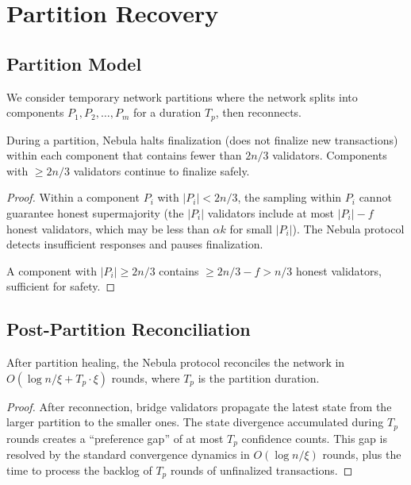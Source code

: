 \section{Partition Recovery}

\label{sec:partition}

\subsection{Partition Model}

We consider temporary network partitions where the network splits into components
$P_1, P_2, \ldots, P_m$ for a duration $T_p$, then reconnects.

\begin{proposition}
\label{prop:partition}
During a partition, Nebula halts finalization (does not finalize new transactions)
within each component that contains fewer than $2n/3$ validators. Components with
$\geq 2n/3$ validators continue to finalize safely.
\end{proposition}

\begin{proof}
Within a component $P_i$ with $|P_i| < 2n/3$, the sampling within $P_i$ cannot
guarantee honest supermajority (the $|P_i|$ validators include at most $|P_i| - f$
honest validators, which may be less than $\alpha k$ for small $|P_i|$). The Nebula
protocol detects insufficient responses and pauses finalization.

A component with $|P_i| \geq 2n/3$ contains $\geq 2n/3 - f > n/3$ honest validators,
sufficient for safety.
\end{proof}

\subsection{Post-Partition Reconciliation}

\begin{proposition}
\label{prop:reconciliation}
After partition healing, the Nebula protocol reconciles the network in $O(\log n / \xi + T_p \cdot \xi)$
rounds, where $T_p$ is the partition duration.
\end{proposition}

\begin{proof}
After reconnection, bridge validators propagate the latest state from the larger
partition to the smaller ones. The state divergence accumulated during $T_p$ rounds
creates a ``preference gap'' of at most $T_p$ confidence counts. This gap is resolved
by the standard convergence dynamics in $O(\log n / \xi)$ rounds, plus the time to
process the backlog of $T_p$ rounds of unfinalized transactions.
\end{proof}

